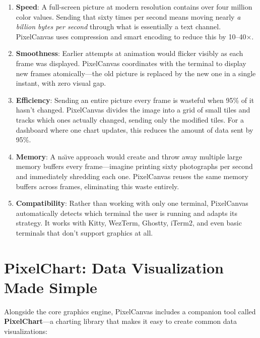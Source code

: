 \documentclass[12pt, a4paper]{article}
\begin{document}
\begin{enumerate}[leftmargin=1.5em, itemsep=0.5em]
    \item \textbf{Speed}: A full-screen picture at modern resolution contains over four million color values. Sending that sixty times per second means moving nearly \emph{a billion bytes per second} through what is essentially a text channel. PixelCanvas uses compression and smart encoding to reduce this by 10--40$\times$.

    \item \textbf{Smoothness}: Earlier attempts at animation would flicker visibly as each frame was displayed. PixelCanvas coordinates with the terminal to display new frames atomically---the old picture is replaced by the new one in a single instant, with zero visual gap.

    \item \textbf{Efficiency}: Sending an entire picture every frame is wasteful when 95\% of it hasn't changed. PixelCanvas divides the image into a grid of small tiles and tracks which ones actually changed, sending only the modified tiles. For a dashboard where one chart updates, this reduces the amount of data sent by 95\%.

    \item \textbf{Memory}: A na\"{\i}ve approach would create and throw away multiple large memory buffers every frame---imagine printing sixty photographs per second and immediately shredding each one. PixelCanvas reuses the same memory buffers across frames, eliminating this waste entirely.

    \item \textbf{Compatibility}: Rather than working with only one terminal, PixelCanvas automatically detects which terminal the user is running and adapts its strategy. It works with Kitty, WezTerm, Ghostty, iTerm2, and even basic terminals that don't support graphics at all.
\end{enumerate}

\section{PixelChart: Data Visualization Made Simple}

Alongside the core graphics engine, PixelCanvas includes a companion tool called \textbf{PixelChart}---a charting library that makes it easy to create common data visualizations:
\end{document}
